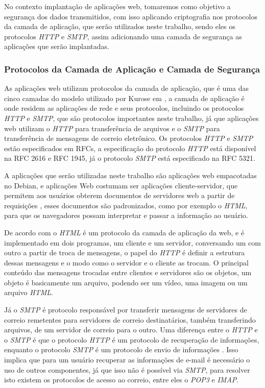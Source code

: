 No contexto implantação de aplicações web, tomaremos como objetivo a segurança
dos dados transmitidos, com isso aplicando criptografia nos protocolos da camada
de aplicação, que serão utilizados neste trabalho, sendo eles os protocolos \textit{HTTP}
e \textit{SMTP}, assim adicionando uma camada de segurança as aplicações que
serão implantadas.

\subsubsection{Protocolos da Camada de Aplicação e Camada de Segurança}

As aplicações web utilizam protocolos da camada de aplicação, que é uma das
cinco camadas do modelo utilizado por Kurose em \cite{kurose2010redes}, a camada
de aplicação é onde residem as aplicações de rede e seus protocolos, incluindo
os protocolos \textit{HTTP} e \textit{SMTP}, que são protocolos importantes neste trabalho, já que
aplicações web utilizam o \textit{HTTP} para transferência de arquivos e o \textit{SMTP} para
transferência de mensagens de correio eletrônico. Os protocolos \textit{HTTP} e \textit{SMTP} estão especificados em RFCs, a especificação do protocolo
\textit{HTTP} está disponível na RFC 2616 e RFC 1945, já o protocolo \textit{SMTP} está especificado na RFC 5321.

A aplicações que serão utilizadas neste trabalho são aplicações web empacotadas no
Debian, e aplicações Web costumam ser aplicações cliente-servidor, que permitem aos
usuários obterem documentos de servidores web a partir de requisições \cite{kurose2010redes},
esses documentos são padronizados, como por exemplo o \textit{HTML}, para que os navegadores
possam interpretar e passar a informação ao usuário.

De acordo com \cite{kurose2010redes} o \textit{HTML} é um protocolo da camada de aplicação
da web, e é implementado em dois programas, um cliente e um servidor, conversando
um com outro a partir de troca de mensagens, o papel do \textit{HTTP} é definir a estrutura dessas
mensagens e o modo como o servidor e o cliente as trocam. O principal conteúdo das
mensagens trocadas entre clientes e servidores são os objetos, um objeto é basicamente
um arquivo, podendo ser um vídeo, uma imagem ou um arquivo \textit{HTML}.

Já o \textit{SMTP} é protocolo responsável por transferir mensagens de servidores de correio
remetentes para servidores de correio destinatários, também transferindo arquivos,
de um servidor de correio para o outro. Uma diferença entre o \textit{HTTP} e o \textit{SMTP}
é que o protocolo \textit{HTTP} é um protocolo de recuperação de informações, enquanto
o protocolo \textit{SMTP} é um protocolo de envio de informações \cite{kurose2010redes}. Isso implica que para um
usuário recuperar as informações de e-mail é necessário o uso de outros componentes,
já que isso não é possível via \textit{SMTP}, para resolver isto existem os protocolos
de acesso ao correio, entre eles o \textit{POP3} e \textit{IMAP}.

